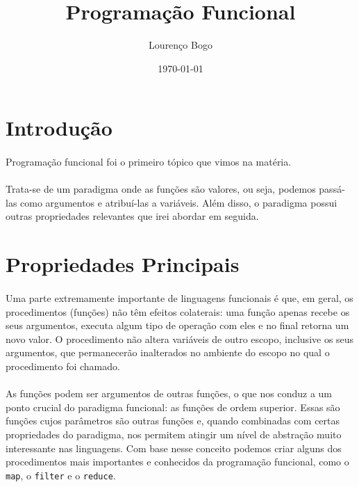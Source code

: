 \documentclass[11pt]{article}
\author{Lourenço Bogo}
\date{\today}
\title{Programação Funcional}
\begin{document}
\maketitle
\tableofcontents

\newpage
\section{Introdução}
\label{sec:orgef3f1ba}

\paragraph{} Programação funcional foi o primeiro tópico que vimos na matéria.
\paragraph{} Trata-se de um paradigma onde as funções são valores, ou seja, podemos passá-las como argumentos e
atribuí-las a variáveis. Além disso, o paradigma possui outras propriedades relevantes que irei abordar em seguida.

\section{Propriedades Principais}
\label{sec:org8506400}
\paragraph{} Uma parte extremamente importante de linguagens funcionais é que, em geral, os procedimentos (funções) não têm efeitos colaterais:
uma função apenas recebe os seus argumentos, executa algum tipo de operação com eles e no final retorna um novo valor.
O procedimento não altera variáveis de outro escopo, inclusive os seus argumentos, que permanecerão inalterados no ambiente do escopo no
qual o procedimento foi chamado.

\paragraph{} As funções podem ser argumentos de outras funções, o que nos conduz a um ponto crucial do paradigma funcional:
as funções de ordem superior. Essas são funções cujos parâmetros são outras funções e, quando combinadas com certas
propriedades do paradigma, nos permitem atingir um nível de abstração muito interessante nas linguagens. Com base nesse conceito
podemos criar alguns dos procedimentos mais importantes e conhecidos da programação funcional, como o \texttt{map}, o \texttt{filter} e o \texttt{reduce}.
\end{document}
